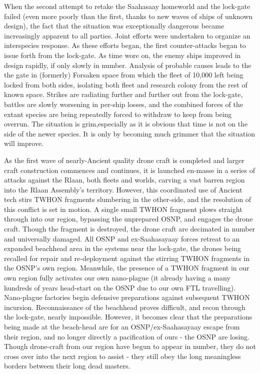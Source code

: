 When the second attempt to retake the Saahasaay homeworld and the lock-gate failed (even more poorly than the first, thanks to new waves of ships of unknown design), the fact that the situation was exceptionally dangerous became increasingly apparent to all parties. Joint efforts were undertaken to organize an interspecies response. As these efforts began, the first counter-attacks began to issue forth from the lock-gate. As time wore on, the enemy ships improved in design rapidly, if only slowly in number. Analysis of probable causes leads to the the gate in (formerly) Forsaken space from which the fleet of 10,000 left being locked from both sides, isolating both fleet and research colony from the rest of known space. Strikes are radiating further and further out from the lock-gate, battles are slowly worsening in per-ship losses, and the combined forces of the extant species are being repeatedly forced to withdraw to keep from being overrun. The situation is grim,especially as it is obvious that time is not on the side of the newer species. It is only by becoming much grimmer that the situation will improve. 

As the first wave of nearly-Ancient quality drone craft is completed and larger craft construction commences and continues, it is launched en-masse in a series of attacks against the Rlaan, both fleets and worlds, carving a vast barren region into the Rlaan Assembly's territory. However, this coordinated use of Ancient tech stirs TWHON fragments slumbering in the other-side, and the resolution of this conflict is set in motion. A single small TWHON fragment plows straight through into our region, bypassing the unprepared OSNP, and engages the drone craft. Though the fragment is destroyed, the drone craft are decimated in number and universally damaged. All OSNP and ex-Saahasayaay forces retreat to an expanded beachhead area in the systems near the lock-gate, the drones being recalled for repair and re-deployment against the stirring TWHON fragments in the OSNP's own region. Meanwhile, the presence of a TWHON fragment in our own region fully activates our own nano-plague (it already having a many hundreds of years head-start on the OSNP due to our own FTL travelling). Nano-plague factories begin defensive preparations against subsequent TWHON incursion. Reconnaissance of the beachhead proves difficult, and recon through the lock-gate, nearly impossible. However, it becomes clear that the preparations being made at the beach-head are for an OSNP/ex-Saahasayaay escape from their region, and no longer directly a pacification of ours - the OSNP are losing. Though drone-craft from our region have begun to appear in number, they do not cross over into the next region to assist - they still obey the long meaningless borders between their long dead masters. 

